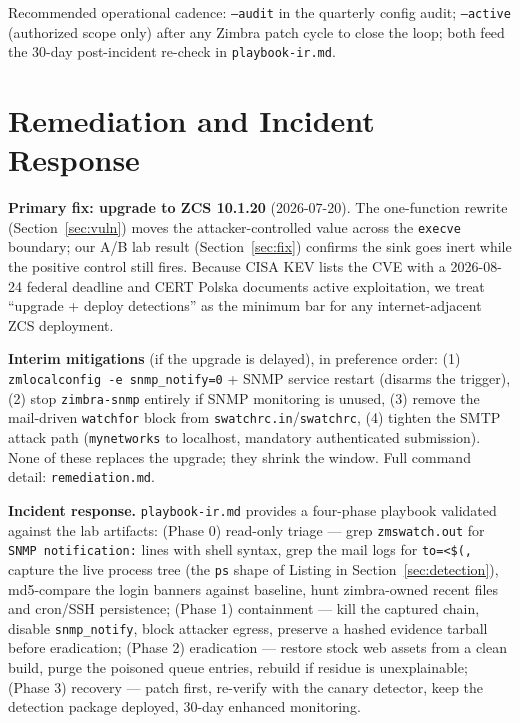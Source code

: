 \documentclass[journal]{IEEEtran}
\begin{document}
Recommended operational cadence: \texttt{--audit} in the quarterly config
audit; \texttt{--active} (authorized scope only) after any Zimbra patch
cycle to close the loop; both feed the 30-day post-incident re-check in
\texttt{playbook-ir.md}.

\section{Remediation and Incident Response}
\label{sec:remediation}

\textbf{Primary fix: upgrade to ZCS 10.1.20} (2026-07-20). The one-function
rewrite (Section~\ref{sec:vuln}) moves the attacker-controlled value across
the \texttt{execve} boundary; our A/B lab result
(Section~\ref{sec:fix}) confirms the sink goes inert while the positive
control still fires. Because CISA KEV lists the CVE with a 2026-08-24
federal deadline and CERT Polska documents active exploitation, we treat
``upgrade + deploy detections'' as the minimum bar for any internet-adjacent
ZCS deployment.

\textbf{Interim mitigations} (if the upgrade is delayed), in preference
order: (1) \texttt{zmlocalconfig -e snmp\_notify=0} + SNMP service restart
(disarms the trigger), (2) stop \texttt{zimbra-snmp} entirely if SNMP
monitoring is unused, (3) remove the mail-driven \texttt{watchfor} block from
\texttt{swatchrc.in}/\texttt{swatchrc}, (4) tighten the SMTP attack path
(\texttt{mynetworks} to localhost, mandatory authenticated submission).
None of these replaces the upgrade; they shrink the window. Full command
detail: \texttt{remediation.md}.

\textbf{Incident response.} \texttt{playbook-ir.md} provides a four-phase
playbook validated against the lab artifacts: (Phase 0) read-only triage —
grep \texttt{zmswatch.out} for \texttt{SNMP notification:} lines with shell
syntax, grep the mail logs for \texttt{to=<\$(,} capture the live process
tree (the \texttt{ps} shape of Listing in Section~\ref{sec:detection}),
md5-compare the login banners against baseline, hunt zimbra-owned recent
files and cron/SSH persistence; (Phase 1) containment — kill the captured
chain, disable \texttt{snmp\_notify}, block attacker egress, preserve a
hashed evidence tarball before eradication; (Phase 2) eradication — restore
stock web assets from a clean build, purge the poisoned queue entries,
rebuild if residue is unexplainable; (Phase 3) recovery — patch first,
re-verify with the canary detector, keep the detection package deployed,
30-day enhanced monitoring.
\end{document}
